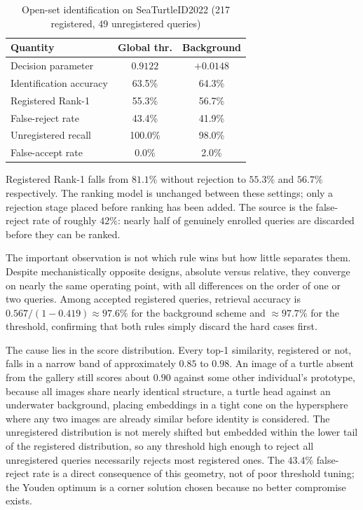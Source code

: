 \documentclass[conference]{IEEEtran}
\begin{document}
\begin{table}[t]
  \caption{Open-set identification on SeaTurtleID2022 (217 registered, 49 unregistered
    queries)}
  \label{tab:openset}
  \centering
  \footnotesize
  \begin{tabular}{@{}lcc@{}}
    \toprule
    \textbf{Quantity}       & \textbf{Global thr.} & \textbf{Background} \\
    \midrule
    Decision parameter      & $0.9122$             & $+0.0148$           \\
    Identification accuracy & 63.5\%               & 64.3\%              \\
    Registered Rank-1       & 55.3\%               & 56.7\%              \\
    False-reject rate       & 43.4\%               & 41.9\%              \\
    Unregistered recall     & 100.0\%              & 98.0\%              \\
    False-accept rate       & 0.0\%                & 2.0\%               \\
    \bottomrule
  \end{tabular}
\end{table}

Registered Rank-1 falls from $81.1\%$ without rejection to $55.3\%$ and $56.7\%$
respectively. The ranking model is unchanged between these settings; only a rejection
stage placed before ranking has been added. The source is the false-reject rate of
roughly $42\%$: nearly half of genuinely enrolled queries are discarded before they can
be ranked.

The important observation is not which rule wins but how little separates them. Despite
mechanistically opposite designs, absolute versus relative, they converge on nearly the
same operating point, with all differences on the order of one or two queries. Among
accepted registered queries, retrieval accuracy is $0.567/(1-0.419) \approx 97.6\%$ for
the background scheme and $\approx 97.7\%$ for the threshold, confirming that both
rules simply discard the hard cases first.

The cause lies in the score distribution. Every top-1 similarity, registered or not,
falls in a narrow band of approximately $0.85$ to $0.98$. An image of a turtle absent
from the gallery still scores about $0.90$ against some other individual's prototype,
because all images share nearly identical structure, a turtle head against an underwater
background, placing embeddings in a tight cone on the hypersphere where any two images
are already similar before identity is considered. The unregistered distribution is not
merely shifted but embedded within the lower tail of the registered distribution, so any
threshold high enough to reject all unregistered queries necessarily rejects most
registered ones. The $43.4\%$ false-reject rate is a direct consequence of this
geometry, not of poor threshold tuning; the Youden optimum is a corner solution chosen
because no better compromise exists.
\end{document}
